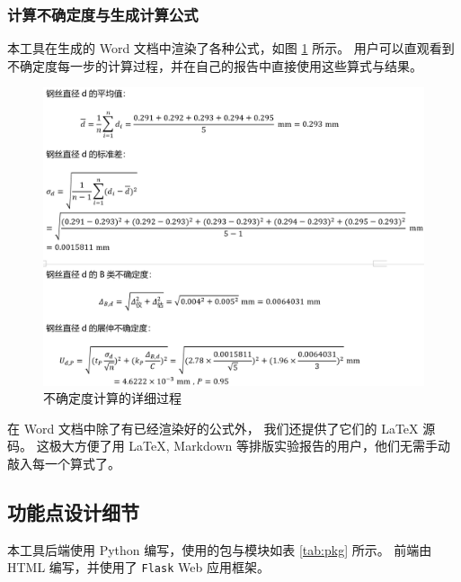 \subsubsection*{计算不确定度与生成计算公式}

本工具在生成的 Word 文档中渲染了各种公式，如图 \ref{fig:calc} 所示。
用户可以直观看到不确定度每一步的计算过程，并在自己的报告中直接使用这些算式与结果。

\begin{figure}[p]
  \centering
  \includegraphics[width=0.67\columnwidth]{figure/calc.png}
  \caption{不确定度计算的详细过程}
  \label{fig:calc}
\end{figure}

在 Word 文档中除了有已经渲染好的公式外，
我们还提供了它们的 \LaTeX{} 源码。
这极大方便了用 \LaTeX{}, Markdown 等排版实验报告的用户，他们无需手动敲入每一个算式了。


\subsection{功能点设计细节}

本工具后端使用 Python 编写，使用的包与模块如表 \ref{tab:pkg} 所示。
前端由 HTML 编写，并使用了 \verb|Flask| Web 应用框架。

